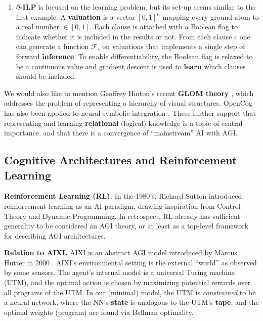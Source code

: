 \documentclass[orivec]{llncs}
\begin{document}
\begin{enumerate}
	\item \textbf{$\partial$-ILP} \cite{Evans2017} is focused on the learning problem, but its set-up seems similar to the first example.  A \textbf{valuation} is a vector $[0,1]^n$ mapping every ground atom to a real number $\in [0,1]$.  Each clause is attached with a Boolean flag to indicate whether it is included in the results or not.  From each clause $c$ one can generate a function $\mathcal{F}_c$ on valuations that implements a single step of forward \textbf{inference}.  To enable differentiability, the Boolean flag is relaxed to be a continuous value and gradient descent is used to \textbf{learn} which clauses should be included.
\end{enumerate}

We would also like to mention Geoffrey Hinton's recent \textbf{GLOM theory} \cite{Hinton2021}, which addresses the problem of representing a hierarchy of visual structures.  OpenCog has also been applied to neural-symbolic integration \cite{Goertzel2009} \cite{Potapov2019}.  These further support that representing and learning \textbf{relational} (logical) knowledge is a topic of central importance, and that there is a convergence of ``mainstream'' AI with AGI.

\subsection{Cognitive Architectures and Reinforcement Learning}

\textbf{Reinforcement Learning (RL).}  In the 1980's, Richard Sutton \cite{Sutton1984} introduced reinforcement learning as an AI paradigm, drawing inspiration from Control Theory and Dynamic Programming.  In retrospect, RL already has sufficient generality to be considered an AGI theory, or at least as a top-level framework for describing AGI architectures.

\textbf{Relation to AIXI.}  AIXI is an abstract AGI model introduced by Marcus Hutter in 2000 \cite{Hutter2005}.  AIXI's environmental setting is the external ``world'' as observed by some sensors.  The agent's internal model is a universal Turing machine (UTM), and the optimal action is chosen by maximizing potential rewards over all programs of the UTM.  In our (minimal) model, the UTM is \textit{constrained} to be a neural network, where the NN's \textbf{state} is analogous to the UTM's \textbf{tape}, and the optimal weights (program) are found via Bellman optimality.
\end{document}
